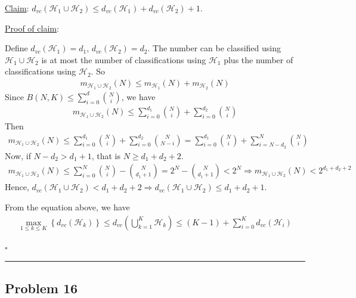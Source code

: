 \documentclass[12pt]{article}
\newcommand*{\QEDB}{\hfill\ensuremath{\square}}
\newcommand{\CBrackets}[1]{\left\{#1\right\}}
\newcommand{\ParTh}[1]{\left(#1\right)}
\newcommand{\horrule}[1]{\rule{\linewidth}{#1}}
\begin{document}
\underline{Claim}: $d_{vc}\ParTh{\mathcal{H}_1\cup\mathcal{H}_2}\leq d_{vc}\ParTh{\mathcal{H}_1}+d_{vc}\ParTh{\mathcal{H}_2}+1$.

\underline{Proof of claim}:

Define $d_{vc}\ParTh{\mathcal{H}_1}=d_1$, $d_{vc}\ParTh{\mathcal{H}_2}=d_2$. The number can be classified using $\mathcal{H}_1\cup\mathcal{H}_2$ is at most  the
number of classifications using $\mathcal{H}_1$ plus the number of classifications using $\mathcal{H}_2$. So
\begin{align}
m_{\mathcal{H}_1\cup\mathcal{H}_2}\ParTh{N}\leq m_{\mathcal{H}_1}\ParTh{N}+m_{\mathcal{H}_2}\ParTh{N}
\end{align}
Since $B\ParTh{N,K}\leq\sum_{i=0}^{d}\binom{N}{i}$, we have
\begin{align}
m_{\mathcal{H}_1\cup\mathcal{H}_2}\ParTh{N}\leq\sum_{i=0}^{d_1}\binom{N}{i}+\sum_{i=0}^{d_2}\binom{N}{i}
\end{align}
Then
\begin{align}
m_{\mathcal{H}_1\cup\mathcal{H}_2}\ParTh{N}\leq\sum_{i=0}^{d_1}\binom{N}{i}+\sum_{i=0}^{d_2}\binom{N}{N-i}=\sum_{i=0}^{d_1}\binom{N}{i}+\sum_{i=N-d_2}^{N}\binom{N}{i}
\end{align}
Now, if $N - d_2 > d_1 + 1$, that is $N \geq d_1 + d_2 + 2$.
\begin{align}
m_{\mathcal{H}_1\cup\mathcal{H}_2}\ParTh{N}\leq\sum_{i=0}^{N}\binom{N}{i}-\binom{N}{d_1+1}=2^N-\binom{N}{d_1+1}<2^N\Rightarrow m_{\mathcal{H}_1\cup\mathcal{H}_2}\ParTh{N}<2^{d_1+d_2+2}
\end{align}
Hence, $d_{vc}\ParTh{\mathcal{H}_1\cup\mathcal{H}_2}<d_1+d_2+2\Rightarrow d_{vc}\ParTh{\mathcal{H}_1\cup\mathcal{H}_2}\leq d_1+d_2+1$.

From the equation above, we have
\begin{align}
\max_{1\leq k\leq K}\CBrackets{d_{vc}\ParTh{\mathcal{H}_k}}\leq d_{vc}\ParTh{\bigcup^K_{k=1}\mathcal{H}_k}\leq \ParTh{K-1}+\sum_{i=0}^{K}d_{vc}\ParTh{\mathcal{H}_i}
\end{align}

\QEDB

\horrule{0.5pt}

\subsection*{Problem 16}
\end{document}
